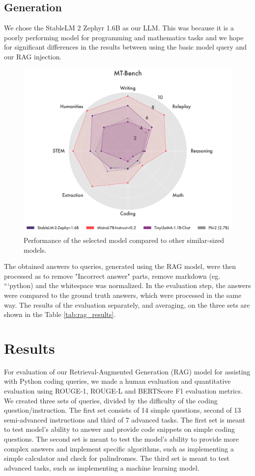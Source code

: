 \documentclass[fleqn,moreauthors,10pt]{ds_report}
\begin{document}
\subsection*{Generation}
We chose the StableLM 2 Zephyr 1.6B \cite{stabilityAI} as our LLM. This was because it is a poorly performing model for programming and mathematics tasks and we hope for significant differences in the results between using the basic model query and our RAG injection. 
\begin{figure}[h]
    \centering
    \includegraphics[width=0.8\linewidth]{fig/QH00HVM3lg-5f17U_py4K.png}
    \caption{Performance of the selected model compared to other similar-sized models.}
    \label{fig:example} %
\end{figure}


The obtained answers to queries, generated using the RAG model, were then processed as to remove "Incorrect answer" parts, remove markdown (eg. ```python) and the whitespace was normalized. In the evaluation step, the answers were compared to the ground truth answers, which were processed in the same way. The results of the evaluation separately, and averaging, on the three sets are shown in the Table \ref{tab:rag_results}. 


\section*{Results}
For evaluation of our Retrieval-Augmented Generation (RAG) model for assisting with Python coding queries, we made a human evaluation and quantitative evaluation using ROUGE-1, ROUGE-L and BERTScore F1 evaluation metrics. We created three sets of queries, divided by the difficulty of the coding question/instruction. The first set consists of 14 simple questions, second of 13 semi-advanced instructions and third of 7 advanced tasks. The first set is meant to test model's ability to answer and provide code snippets on simple coding questions. The second set is meant to test the model's ability to provide more complex answers and implement specific algorithms, such as implementing a simple calculator and check for palindromes. The third set is meant to test advanced tasks, such as implementing a machine learning model. 
\end{document}
